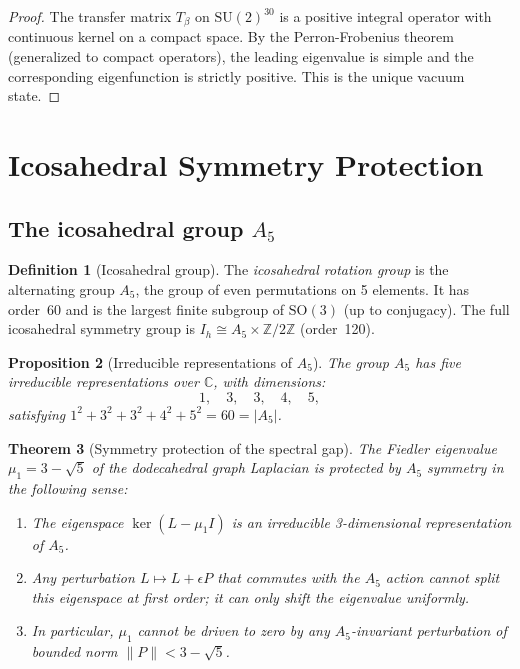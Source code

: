 \documentclass[12pt,a4paper]{article}
\newtheorem{theorem}{Theorem}[section]
\newtheorem{proposition}[theorem]{Proposition}
\theoremstyle{definition}
\newtheorem{definition}[theorem]{Definition}
\theoremstyle{remark}
\newcommand{\Z}{\mathbb{Z}}
\newcommand{\C}{\mathbb{C}}
\newcommand{\SU}{\mathrm{SU}}
\newcommand{\SO}{\mathrm{SO}}
\begin{document}
\begin{proof}
The transfer matrix $T_\beta$ on $\SU(2)^{30}$ is a positive integral
operator with continuous kernel on a compact space.  By the
Perron-Frobenius theorem (generalized to compact operators), the leading
eigenvalue is simple and the corresponding eigenfunction is strictly
positive.  This is the unique vacuum state.
\end{proof}

\section{Icosahedral Symmetry Protection}\label{sec:symmetry}

\subsection{The icosahedral group $A_5$}\label{ssec:A5}

\begin{definition}[Icosahedral group]\label{def:A5}
The \emph{icosahedral rotation group} is the alternating group $A_5$,
the group of even permutations on 5 elements.  It has order~60 and is the
largest finite subgroup of $\SO(3)$ (up to conjugacy).  The full
icosahedral symmetry group is $I_h \cong A_5 \times \Z/2\Z$ (order~120).
\end{definition}

\begin{proposition}[Irreducible representations of $A_5$]\label{prop:A5irreps}
The group $A_5$ has five irreducible representations over $\C$, with
dimensions:
\[
  1, \quad 3, \quad 3, \quad 4, \quad 5,
\]
satisfying $1^2 + 3^2 + 3^2 + 4^2 + 5^2 = 60 = |A_5|$.
\end{proposition}

\begin{theorem}[Symmetry protection of the spectral gap]\label{thm:symprotect}
The Fiedler eigenvalue $\mu_1 = 3 - \sqrt{5}$ of the dodecahedral graph
Laplacian is protected by $A_5$ symmetry in the following sense:
\begin{enumerate}[label=\textup{(\alph*)}]
  \item The eigenspace $\ker(L - \mu_1 I)$ is an irreducible
        3-dimensional representation of $A_5$.
  \item Any perturbation $L \mapsto L + \epsilon P$ that commutes with the
        $A_5$ action cannot split this eigenspace at first order; it can
        only shift the eigenvalue uniformly.
  \item In particular, $\mu_1$ cannot be driven to zero by any
        $A_5$-invariant perturbation of bounded norm
        $\|P\| < 3 - \sqrt{5}$.
\end{enumerate}
\end{theorem}
\end{document}
